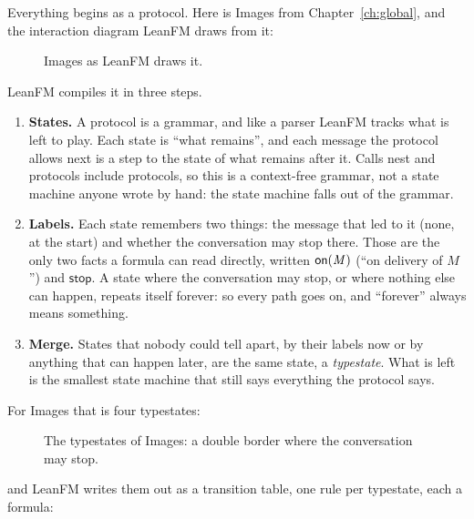 Everything begins as a protocol. Here is Images from Chapter~\ref{ch:global}, and the
interaction diagram LeanFM draws from it:



\begin{figure}[ht]
\centering
{}
\caption{Images as LeanFM draws it.}
\end{figure}

LeanFM compiles it in three steps.
\begin{enumerate}
\item \textbf{States.} A protocol is a grammar, and like a parser LeanFM tracks what is
  left to play. Each state is ``what remains'', and each message the protocol allows next
  is a step to the state of what remains after it. Calls nest and protocols include
  protocols, so this is a context-free grammar, not a state machine anyone wrote by hand:
  the state machine falls out of the grammar.
\item \textbf{Labels.} Each state remembers two things: the message that led to it (none,
  at the start) and whether the conversation may stop there. Those are the only two facts
  a formula can read directly, written $\mathsf{on}(\mathit{M})$ (``on delivery of $M$'') and
  $\mathsf{stop}$. A state where the conversation may stop, or where nothing else can
  happen, repeats itself forever: so every path goes on, and ``forever'' always means
  something.
\item \textbf{Merge.} States that nobody could tell apart, by their labels now or by
  anything that can happen later, are the same state, a \emph{typestate}. What is left is
  the smallest state machine that still says everything the protocol says.
\end{enumerate}

For Images that is four typestates:

\begin{figure}[ht]
\centering
{}
\caption{The typestates of Images: a double border where the conversation may stop.}
\end{figure}

and LeanFM writes them out as a transition table, one rule per typestate, each a formula:

